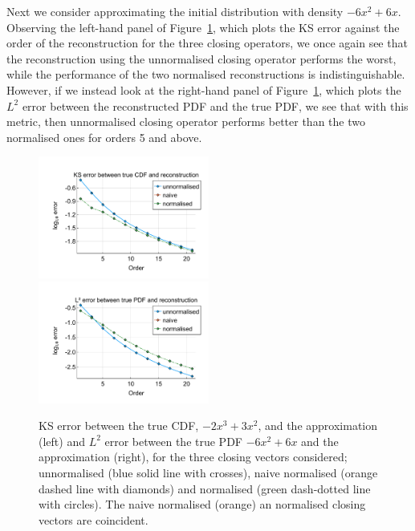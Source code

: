 \begin{example}Next we consider approximating the initial distribution with density \(-6x^2+6x\). Observing the left-hand panel of Figure~\ref{fig: fun 6 ks error qbdrap closing vecs}, which plots the KS error against the order of the reconstruction for the three closing operators, we once again see that the reconstruction using the unnormalised closing operator performs the worst, while the performance of the two normalised reconstructions is indistinguishable. However, if we instead look at the right-hand panel of Figure~\ref{fig: fun 6 ks error qbdrap closing vecs}, which plots the \(L^2\) error between the reconstructed PDF and the true PDF, we see that with this metric, then unnormalised closing operator performs better than the two normalised ones for orders 5 and above. 
\begin{figure}
	\centering
	\includegraphics[width=0.5\textwidth,trim={1.25cm 0.8cm 0.25cm 1.25cm},clip]{chapter6/figs/qbdrap_closing_vec/fun6/ks_error_formatted.pdf}%
	\includegraphics[width=0.5\textwidth,trim={1.25cm 0.8cm 0.25cm 1.25cm},clip]{chapter6/figs/qbdrap_closing_vec/fun6/l2_pdf_error_formatted.pdf}
	\caption{KS error between the true CDF, \(-2x^3+3x^2\), and the approximation (left) and \(L^2\) error between the true PDF \(-6x^2+6x\) and the approximation (right), for the three closing vectors considered; unnormalised (blue solid line with crosses), naive normalised (orange dashed line with diamonds) and normalised (green dash-dotted line with circles). The naive normalised (orange) an normalised closing vectors are coincident.}
	\label{fig: fun 6 ks error qbdrap closing vecs}
\end{figure}


\end{example}
